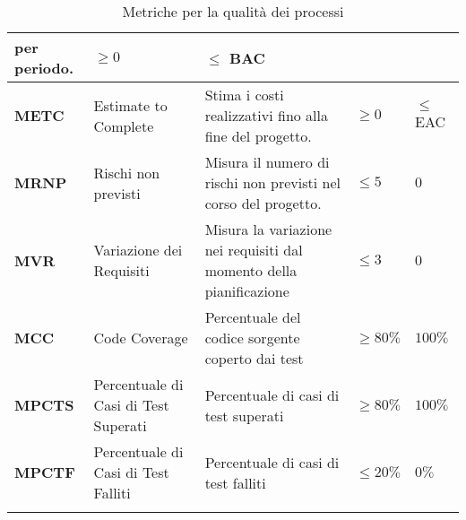 \begin{longtable}{|C{1.5cm}|L{3cm}|L{4cm}|L{2.5cm}|L{2.5cm}|}
        per periodo. & $\geq 0  $ & $ \leq$ BAC  \\
        \hline
        \textbf{METC} & Estimate to Complete &  Stima i costi realizzativi fino alla fine del progetto. & $\geq 0  $ & $ \leq$ EAC  \\
        \hline
        \textbf{MRNP}    & Rischi non previsti   & Misura il numero di rischi non previsti nel corso del progetto. & $\leq 5$ &   $0$ \\
        \hline
        \textbf{MVR} & Variazione dei Requisiti & Misura la variazione nei requisiti dal momento della pianificazione & $\leq 3$ & $0$ \\
        \hline
        \textbf{MCC} & Code Coverage & Percentuale del codice sorgente coperto dai test & $\geq 80\%$ & $100\%$ \\
        \hline
        \textbf{MPCTS} & Percentuale di Casi di Test Superati & Percentuale di casi di test superati & $\geq 80\%$ & $100\%$ \\
        \hline
        \textbf{MPCTF} & Percentuale di Casi di Test Falliti & Percentuale di casi di test falliti & $\leq 20\%$ & $0\%$ \\
        \hline
        \caption{Metriche per la qualità dei processi}
        \label{tab:qualità_processo_progetto}
        \end{longtable}